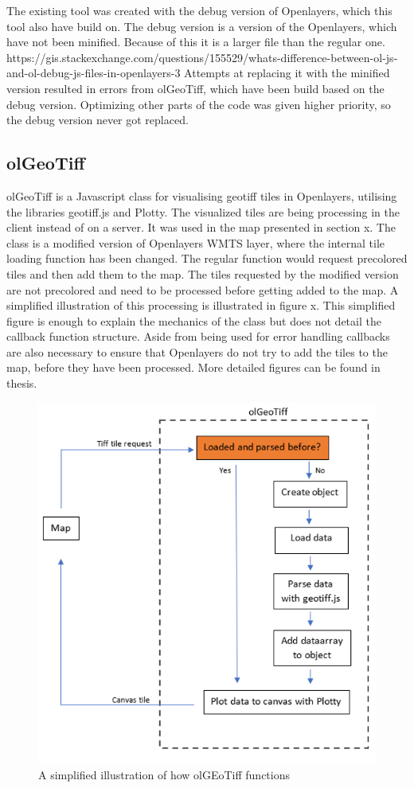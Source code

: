 The existing tool was created with the debug version of Openlayers, which this tool also have build on. The debug version is a version of the Openlayers, which have not been minified. Because of this it is a larger file than the regular one. 
https://gis.stackexchange.com/questions/155529/whats-difference-between-ol-js-and-ol-debug-js-files-in-openlayers-3
Attempts at replacing it with the minified version resulted in errors from olGeoTiff, which have been build based on the debug version. Optimizing other parts of the code was given higher priority, so the debug version never got replaced. 

\subsection*{olGeoTiff}
olGeoTiff is a Javascript class for visualising geotiff tiles in Openlayers, utilising the libraries geotiff.js and Plotty. The visualized tiles are being processing in the client instead of on a server. It was used in the map presented in section x. 
The class is a modified version of Openlayers WMTS layer, where the internal tile loading function has been changed. The regular function would request precolored tiles and then add them to the map. The tiles requested by the modified version are not precolored and need to be processed before getting added to the map. A simplified illustration of this processing is illustrated in figure x. This simplified figure is enough to explain the mechanics of the class but does not detail the callback function structure. Aside from being used for error handling callbacks are also necessary to ensure that Openlayers do not try to add the tiles to the map, before they have been processed. More detailed figures can be found in \citep{Baumrocks} thesis.

\begin{figure} [H]
	\centering
	\includegraphics[width=.8\textwidth]{Pictures/olGeoTiffSimplified}
	\caption{A simplified illustration of how olGEoTiff functions}
	\label{olGeoTiffSimplified}
\end{figure}

